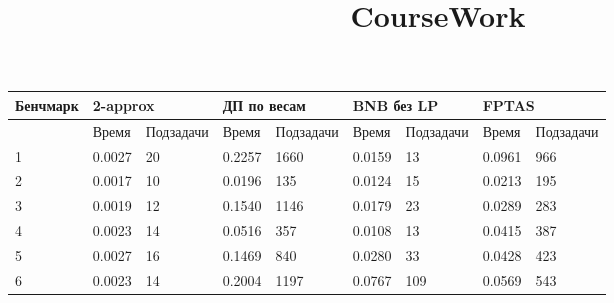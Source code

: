 \documentclass{article}
\title{CourseWork}
\author{}
\date{}
\begin{document}
\setlength{\parindent}{35pt}
\setlength{\footnotemargin}{5pt}
\sloppy
\frenchspacing %



\begin{table}[!h]
    \begin{center}
        \begin{tabular}{ | m{4.1em} | m{3em} | m{4.5em} | m{3em} | m{4.5em} | m{3em} | m{4.5em}| m{3em} | m{4.5em}|}
            \hline
            Бенчмарк & \multicolumn{2}{p{7.5em}|}{2-approx} & \multicolumn{2}{p{7.5em}|}{ДП по весам} & \multicolumn{2}{p{7.5em}|}{BNB без LP} & \multicolumn{2}{p{7.5em}|}{FPTAS}                                           \\
            \hline
                     & Время                                & Подзадачи                               & Время                                  & Подзадачи                         & Время  & Подзадачи & Время  & Подзадачи \\
            \hline
            1        & 0.0027                               & 20                                      & 0.2257                                 & 1660                              & 0.0159 & 13        & 0.0961 & 966       \\
            \hline
            2        & 0.0017                               & 10                                      & 0.0196                                 & 135                               & 0.0124 & 15        & 0.0213 & 195       \\
            \hline
            3        & 0.0019                               & 12                                      & 0.1540                                 & 1146                              & 0.0179 & 23        & 0.0289 & 283       \\
            \hline
            4        & 0.0023                               & 14                                      & 0.0516                                 & 357                               & 0.0108 & 13        & 0.0415 & 387       \\
            \hline
            5        & 0.0027                               & 16                                      & 0.1469                                 & 840                               & 0.0280 & 33        & 0.0428 & 423       \\
            \hline
            6        & 0.0023                               & 14                                      & 0.2004                                 & 1197                              & 0.0767 & 109       & 0.0569 & 543       \\

\end{tabular}
\end{center}
\end{table}
\end{document}
